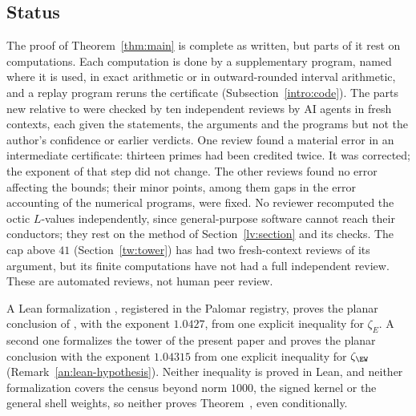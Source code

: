 \subsection{Status}\label{intro:status}
The proof of Theorem~\ref{thm:main} is complete as written, but parts of
it rest on computations. Each computation is done by a supplementary
program, named where it is used, in exact arithmetic or in outward-rounded
interval arithmetic, and a replay program reruns the certificate
(Subsection~\ref{intro:code}). The parts new relative to
\cite{Naslund04273} were checked by ten independent reviews by AI agents
in fresh contexts, each given the statements, the arguments and the
programs but not the author's confidence or earlier verdicts. One review
found a material error in an intermediate certificate: thirteen primes
had been credited twice. It was corrected; the exponent of that step did
not change. The other reviews found no error affecting the bounds; their
minor points, among them gaps in the error accounting of the numerical
programs, were fixed. No reviewer recomputed the octic $L$-values
independently, since general-purpose software cannot reach their
conductors; they rest on the method of Section~\ref{lv:section} and its
checks. The cap above $41$ (Section~\ref{tw:tower}) has had two
fresh-context reviews of its argument, but its finite computations have
not had a full independent review. These are automated reviews, not human
peer review.

A Lean formalization \cite{NaslundLean2026}, registered in the Palomar
registry, proves the planar conclusion of \cite{Naslund04273}, with the
exponent $1.0427$, from one explicit inequality for $\zeta_E$. A second
one \cite{NaslundLeanW} formalizes the tower of the present paper and
proves the planar conclusion with the exponent $1.04315$ from one explicit
inequality for $\zeta_{\EW}$ (Remark~\ref{an:lean-hypothesis}). Neither
inequality is proved in Lean, and neither formalization covers the census
beyond norm $1000$, the signed kernel or the general shell weights, so
neither proves Theorem~, even conditionally.

